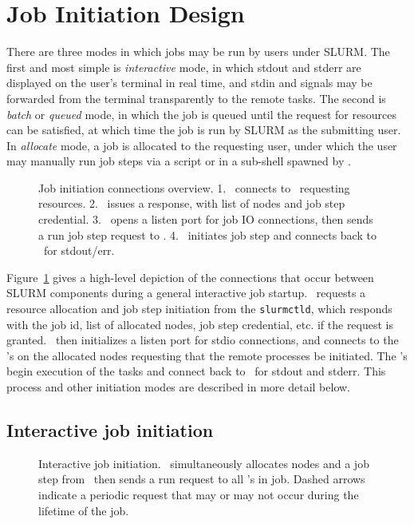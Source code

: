 \documentclass[10pt,onecolumn,times]{../common/llncs}
\begin{document}
{\section{Job Initiation Design}

There are three modes in which jobs may be run by users under SLURM. The
first and most simple is {\em interactive} mode, in which stdout and
stderr are displayed on the user's terminal in real time, and stdin and
signals may be forwarded from the  terminal transparently to the remote
tasks. The second is {\em batch} or {\em queued} mode, in which the job is
queued until the request for resources can be satisfied, at which time the
job is run by SLURM as the submitting user. In {\em allocate} mode,
a job is allocated to the requesting user, under which the user may
manually run job steps via a script or in a sub-shell spawned by \srun .

\begin{figure}[tb]
\centerline{}
\caption{\small Job initiation connections overview. 1. \srun\ connects to 
         \slurmctld\ requesting resources. 2. \slurmctld\ issues a response,
	 with list of nodes and job step credential. 3. \srun\ opens a listen
	 port for job IO connections, then sends a run job step
	 request to \slurmd . 4. \slurmd\ initiates job step and connects
	 back to \srun\ for stdout/err. }
\label{connections}
\end{figure}

Figure~\ref{connections} gives a high-level depiction of the connections
that occur between SLURM components during a general interactive
job startup.  \srun\ requests a resource allocation and job step
initiation from the {\tt slurmctld}, which responds with the job id,
list of allocated nodes, job step credential, etc.  if the request is granted.
\srun\ then initializes a listen port for stdio connections, and connects
to the \slurmd 's on the allocated nodes requesting that the remote
processes be initiated. The \slurmd 's begin execution of the tasks and
connect back to \srun\ for stdout and stderr. This process and other
initiation modes are described in more detail below.

\subsection{Interactive job initiation}

\begin{figure}[tb]
\centerline{ }
\caption{\small Interactive job initiation. \srun\ simultaneously allocates
	 nodes and a job step from \slurmctld\ then sends a run request to all
	 \slurmd 's in job. Dashed arrows indicate a periodic request that
	 may or may not occur during the lifetime of the job.}
\label{init-interactive}
\end{figure}

}
\end{document}
